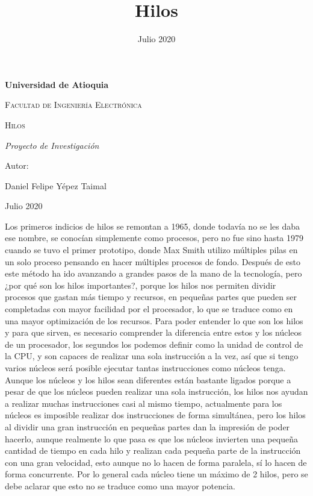 \documentclass{article}
\title{Hilos}
\date{Julio 2020}
\begin{document}
\begin{titlepage}
\centering
{\bfseries\LARGE Universidad de Atioquia\par}
\vspace{1cm}
{\scshape\Large Facultad de Ingenier\'ia Electr\'onica \par}
\vspace{3cm}
{\scshape\Huge Hilos \par}
\vspace{3cm}
{\itshape\Large Proyecto de Investigaci\'on \par}
\vfill
{\Large Autor: \par}
{\Large Daniel Felipe Y\'epez Taimal \par}
\vfill
{\Large Julio 2020 \par}
\end{titlepage}

\maketitle


\cite{Br} Los primeros indicios de hilos se remontan a 1965, donde todavía no se les daba ese nombre, se conocían simplemente como procesos, pero no fue sino hasta 1979 cuando se tuvo el primer prototipo, donde Max Smith utilizo múltiples pilas en un solo proceso pensando en hacer múltiples procesos de fondo. Después de esto este método ha ido avanzando a grandes pasos de la mano de la tecnología, pero ¿por qué son los hilos importantes?, \cite{Jes} porque los hilos nos permiten dividir procesos que gastan más tiempo y recursos, en pequeñas partes que pueden ser completadas con mayor facilidad por el procesador, lo que se traduce como en una mayor optimización de los recursos. Para poder entender lo que son los hilos y para que sirven, es necesario comprender la diferencia entre estos y los núcleos de un procesador, los segundos los podemos definir como la unidad de control de la CPU, y son capaces de realizar una sola instrucción a la vez, \cite{Jes} así que si tengo varios núcleos será posible ejecutar tantas instrucciones como núcleos tenga. \\

Aunque los núcleos y los hilos sean diferentes están bastante ligados porque a pesar de que los núcleos pueden realizar una sola instrucción, los hilos nos ayudan a realizar muchas instrucciones casi al mismo tiempo, actualmente para los núcleos es imposible realizar dos instrucciones de forma simultánea, pero los hilos al dividir una gran instrucción en pequeñas partes dan la impresión de poder hacerlo, aunque \cite{Jes} realmente lo que pasa es que  los núcleos invierten una pequeña cantidad de tiempo en cada hilo y realizan cada pequeña parte de la instrucción con una gran velocidad, esto aunque no lo hacen de forma paralela, sí lo hacen de forma concurrente. Por lo general cada núcleo tiene un máximo de 2 hilos, pero se debe aclarar que esto no se traduce como una mayor potencia.\\
\end{document}

